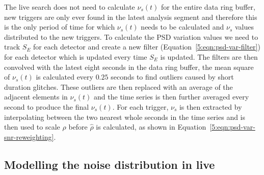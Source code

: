 The live search does not need to calculate $\nu_{s}(t)$ for the entire data ring buffer, new triggers are only ever found in the latest analysis segment and therefore this is the only period of time for which $\nu_{s}(t)$ needs to be calculated and $\nu_{s}$ values distributed to the new triggers. To calculate the PSD variation values we need to track $S_{E}$ for each detector and create a new filter (Equation~\ref{5:eqn:psd-var-filter}) for each detector which is updated every time $S_{E}$ is updated. The filters are then convolved with the latest eight seconds in the data ring buffer, the mean square of $\nu_{s}(t)$ is calculated every $0.25$ seconds to find outliers caused by short duration glitches. These outliers are then replaced with an average of the adjacent elements in $\nu_{s}(t)$ and the time series is then further averaged every second to produce the final $\nu_{s}(t)$. For each trigger, $\nu_{s}$ is then extracted by interpolating between the two nearest whole seconds in the time series and is then used to scale $\rho$ before $\hat{\rho}$ is calculated, as shown in Equation~\ref{5:eqn:psd-var-snr-reweighting}.

\subsection{\label{5:subsec:template-fits}Modelling the noise distribution in live}

